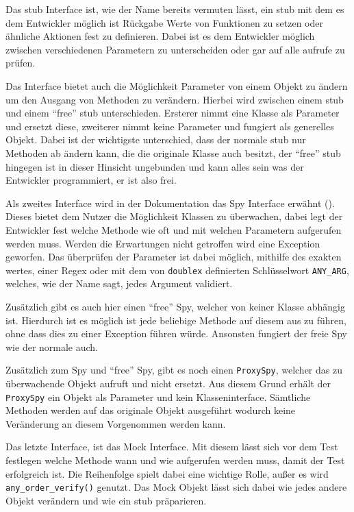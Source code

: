 Das \Gls{stub} Interface ist, wie der Name bereits vermuten lässt, ein
\Gls{stub} mit dem es dem Entwickler möglich ist Rückgabe Werte von Funktionen
zu setzen oder ähnliche Aktionen fest zu definieren. Dabei ist es dem Entwickler
möglich zwischen verschiedenen Parametern zu unterscheiden oder gar auf alle
aufrufe zu prüfen.

Das Interface bietet auch die Möglichkeit Parameter von einem Objekt zu ändern
um den Ausgang von Methoden zu verändern. Hierbei wird zwischen einem \Gls{stub}
und einem "`free"' \Gls{stub} unterschieden. Ersterer nimmt eine Klasse als
Parameter und ersetzt diese, zweiterer nimmt keine Parameter und fungiert als
generelles Objekt. Dabei ist der wichtigste unterschied, dass der normale
\Gls{stub} nur Methoden ab ändern kann, die die originale Klasse auch besitzt,
der "`free"' \Gls{stub} hingegen ist in dieser Hinsicht ungebunden und kann
alles sein was der Entwickler programmiert, er ist also frei.
\newline

Als zweites Interface wird in der Dokumentation das Spy Interface erwähnt
(\cite{doublex:docs:1.8.1}). Dieses bietet dem Nutzer die Möglichkeit Klassen zu
überwachen, dabei legt der Entwickler fest welche Methode wie oft und mit
welchen Parametern aufgerufen werden muss. Werden die Erwartungen nicht
getroffen wird eine Exception geworfen. Das überprüfen der Parameter ist dabei
möglich, mithilfe des exakten wertes, einer Regex oder mit dem von
\lstinline{doublex} definierten Schlüsselwort \lstinline{ANY_ARG}, welches, wie
der Name sagt, jedes Argument validiert.

Zusätzlich gibt es auch hier einen "`free"' Spy, welcher von keiner
Klasse abhängig ist. Hierdurch ist es möglich ist jede beliebige Methode auf
diesem aus zu führen, ohne dass dies zu einer Exception führen würde. Ansonsten
fungiert der freie Spy wie der normale auch.
\newline

Zusätzlich zum Spy und "`free"' Spy, gibt es noch einen \lstinline{ProxySpy},
welcher das zu überwachende Objekt aufruft und nicht ersetzt. Aus diesem Grund
erhält der \lstinline{ProxySpy} ein Objekt als Parameter und kein
Klasseninterface. Sämtliche Methoden werden auf das originale Objekt ausgeführt
wodurch keine Veränderung an diesem Vorgenommen werden kann.
\newline

Das letzte Interface, ist das Mock Interface. Mit diesem lässt sich vor dem Test
festlegen welche Methode wann und wie aufgerufen werden muss, damit der Test
erfolgreich ist. Die Reihenfolge spielt dabei eine wichtige Rolle, außer es wird
\lstinline{any_order_verify()} genutzt. Das Mock Objekt lässt sich dabei wie
jedes andere Objekt verändern und wie ein \Gls{stub} präparieren.

